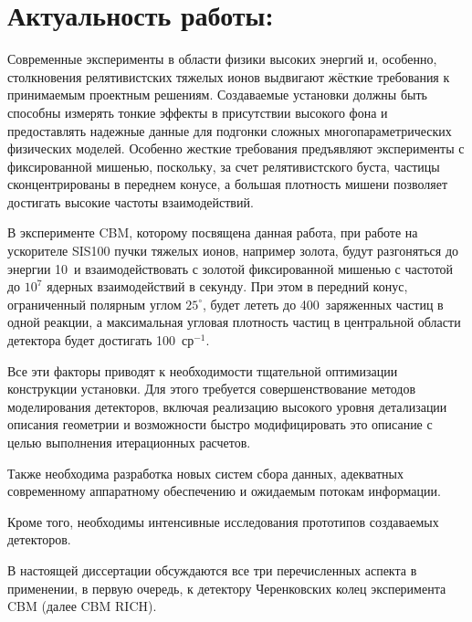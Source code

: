 \section*{Актуальность работы:}

Современные эксперименты в области физики высоких энергий и, особенно, столкновения релятивистских тяжелых ионов выдвигают жёсткие требования к принимаемым проектным решениям. Создаваемые установки должны быть способны измерять тонкие эффекты в присутствии высокого фона и предоставлять надежные данные для подгонки сложных многопараметрических физических моделей. Особенно жесткие требования предъявляют эксперименты с фиксированной мишенью, поскольку, за счет релятивистского буста, частицы сконцентрированы в переднем конусе, а большая плотность мишени позволяет достигать высокие частоты взаимодействий.

В эксперименте CBM, которому посвящена данная работа, при работе на ускорителе SIS100 пучки тяжелых ионов, например золота, будут разгоняться до энергии 10~\GeVperNucl и взаимодействовать с золотой фиксированной мишенью с частотой до $10^7$ ядерных взаимодействий в секунду. При этом в передний конус, ограниченный полярным углом $25^\circ$, будет лететь до 400~заряженных частиц в одной реакции, а максимальная угловая плотность частиц в центральной области детектора будет достигать 100~ср$^{-1}$.

Все эти факторы приводят к необходимости тщательной оптимизации конструкции установки. Для этого требуется совершенствование методов моделирования детекторов, включая реализацию высокого уровня детализации описания геометрии и возможности быстро модифицировать это описание с целью выполнения итерационных расчетов.

Также необходима разработка новых систем сбора данных, адекватных современному аппаратному обеспечению и ожидаемым потокам информации.

Кроме того, необходимы интенсивные исследования прототипов создаваемых детекторов.

В настоящей диссертации обсуждаются все три перечисленных аспекта в применении, в первую очередь, к детектору Черенковских колец эксперимента CBM (далее CBM RICH).